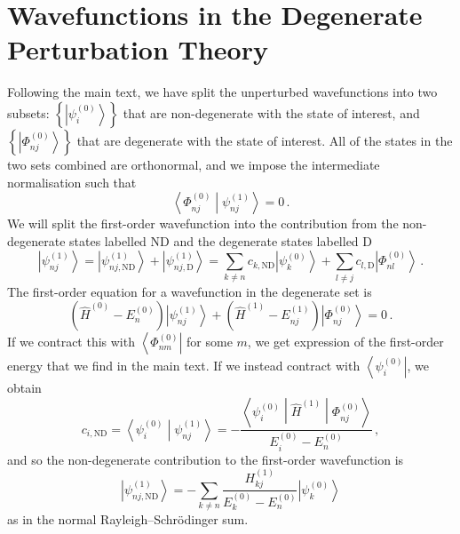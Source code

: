 \documentclass{article}
\theoremstyle{plain}\theoremheaderfont{\normalfont\itshape}\theorembodyfont{\rmfamily}\theoremseparator{.}\newtheorem*{rem}{Remark}\newtheorem*{ex}{Example}\newtheorem*{proof}{Proof}\newtheorem*{altp}{Alternative proof}
\theoremstyle{plain}\theoremheaderfont{\normalfont\bfseries}\theorembodyfont{\rmfamily}\theoremseparator{.}\newtheorem{thm}{Theorem}[section]\newtheorem{lem}[thm]{Lemma}\newtheorem{prop}[thm]{Proposition}\newtheorem*{cor}{Corollary}\newtheorem{defn}[thm]{Definition}\newtheorem{clm}[thm]{Claim}\newtheorem{clminproof}{Claim}
\theoremstyle{break}\theoremheaderfont{\normalfont\itshape}\theorembodyfont{\rmfamily}\theoremseparator{.\medskip}\newtheorem*{proofskip}{Proof}\newtheorem*{exs}{Examples}\newtheorem*{rems}{Remarks}
\theoremstyle{break}\theoremheaderfont{\normalfont\bfseries}\theorembodyfont{\rmfamily}\theoremseparator{.\medskip}\newtheorem{lemskip}[thm]{Lemma}\newtheorem{defnskip}[thm]{Definition}\newtheorem{propskip}[thm]{Proposition}\newtheorem{thmskip}[thm]{Theorem}
\numberwithin{equation}{section}
\newcommand{\bra}[1]{\left\langle #1 \right|}
\newcommand{\ket}[1]{\left| #1 \right\rangle}
\newcommand{\braket}[2]{\left\langle #1 \middle| #2 \right\rangle}
\newcommand{\mel}[3]{\left\langle #1 \middle| #2 \middle| #3 \right\rangle}
\begin{document}
    \section{Wavefunctions in the Degenerate Perturbation Theory}\label{Chap:degenerate_PT_first_order_wavefunction}

    Following the main text, we have split the unperturbed wavefunctions into two subsets: \(\left\{\ket{\psi_i^{(0)}}\right\}\) that are non-degenerate with the state of interest, and \(\left\{\ket{\Phi_{nj}^{(0)}}\right\}\) that are degenerate with the state of interest. All of the states in the two sets combined are orthonormal, and we impose the intermediate normalisation such that
    \begin{equation}
        \braket{\Phi_{nj}^{(0)}}{\psi_{nj}^{(1)}}=0\,.
    \end{equation}
    We will split the first-order wavefunction into the contribution from the non-degenerate states labelled ND and the degenerate states labelled D
    \begin{equation}
        \ket{\psi_{nj}^{(1)}}=\ket{\psi_{nj,\text{ND}}^{(1)}}+\ket{\psi_{nj,\text{D}}^{(1)}}=\sum_{k\ne n}c_{k,\text{ND}}\ket{\psi_k^{(0)}}+\sum_{l\ne j}c_{l,\text{D}}\ket{\Phi_{nl}^{(0)}}\,.
    \end{equation}
    The first-order equation for a wavefunction in the degenerate set is
    \begin{equation}
        (\hat{H}^{(0)}-E_n^{(0)})\ket{\psi_{nj}^{(1)}}+(\hat{H}^{(1)}-E_{nj}^{(1)})\ket{\Phi_{nj}^{(0)}}=0\,.
    \end{equation}
    If we contract this with \(\bra{\Phi_{nm}^{(0)}}\) for some \(m\), we get expression of the first-order energy that we find in the main text. If we instead contract with \(\bra{\psi_i^{(0)}}\), we obtain
    \begin{equation}
        c_{i,\text{ND}}=\braket{\psi_i^{(0)}}{\psi_{nj}^{(1)}}=-\frac{\mel{\psi_i^{(0)}}{\hat{H}^{(1)}}{\Phi_{nj}^{(0)}}}{E_i^{(0)}-E_n^{(0)}}\,,
    \end{equation}
    and so the non-degenerate contribution to the first-order wavefunction is
    \begin{equation}
        \ket{\psi_{nj,\text{ND}}^{(1)}}=-\sum_{k\ne n}\frac{H_{kj}^{(1)}}{E_k^{(0)}-E_n^{(0)}}\ket{\psi_k^{(0)}}
    \end{equation}
    as in the normal Rayleigh--Schr\"{o}dinger sum.
\end{document}
